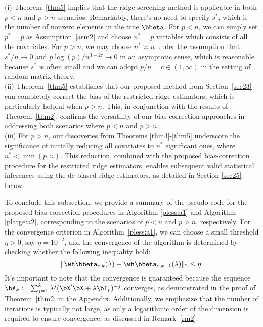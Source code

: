 \begin{remark}
  (i)   Theorem~\ref{thm5} implies that the ridge-screening method is applicable in both  $p<n$ and $p>n$ scenarios. Remarkably, there's no need to specify $s^*$, which is the number of nonzero elements in the true $\bbeta$. For $p<n$, we can simply set $p^*=p$ as Assumption~\ref{asm2} and choose $n^*=p$ variables which consists of all the covariates. For $p>n$, we  may choose $n^*\asymp n$ under the assumption that $s^*/n\rightarrow 0$ and $p\log(p)/n^{3-2\tau}\rightarrow 0$ in an asymptotic sense, which is reasonable because $s^*$ is often small and we can adopt $p/n=c\in (1,\infty)$ in the setting of random matrix theory. \\
  (ii) Theorem~\ref{thm5} establishes that our proposed method from Section~\ref{sec23} can completely correct the bias of the restricted ridge estimators, which is particularly helpful when $p>n$. This, in conjunction with the results of Theorem~\ref{thm2}, confirms the versatility of our bias-correction approaches in addressing both scenarios where $p<n$ and $p>n$.\\
  (iii)   For $p > n$, our discoveries from Theorems \ref{thm4}-\ref{thm5} underscore the significance of initially reducing all covariates to $n^*$ significant ones, where $n^*< \min(p,n)$. This reduction, combined with the proposed bias-correction procedure for the restricted ridge estimators, enables subsequent valid statistical inferences using the de-biased ridge estimators, as detailed in Section \ref{sec25} below.
\end{remark}

To conclude this subsection, we provide a summary of the pseudo-code for the proposed bias-correction procedures in Algorithm \ref{pless:a1} and Algorithm \ref{plarge:a2}, corresponding to the scenarios of $p < n$ and $p > n$, respectively. For the convergence criterion in Algorithm~\ref{pless:a1}, we can choose a small threshold $\eta>0$, say $\eta=10^{-2}$, and the convergence of the algorithm is determined by checking whether the following inequality hold:
\begin{equation}\label{con:cri}
    \|\wh\bbeta_{c,k}(\lambda)-\wh\bbeta_{c,k-1}(\lambda)\|_2\leq \eta.
\end{equation}
It's important to note that the convergence is guaranteed because the sequence $\bA_k:=\sum_{j=1}^k\lambda^j(\bX'\bX+\lambda\bI_p)^{-j}$ converges, as demonstrated in the proof of  Theorem~\ref{thm2} in the Appendix. Additionally, we emphasize that the number of iterations is typically not large, as only a logarithmic order of the dimension is required to ensure convergence, as discussed in Remark~\ref{rm2}.


